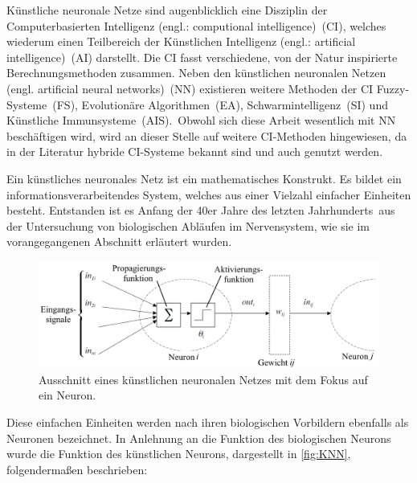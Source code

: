 
Künstliche neuronale Netze sind augenblicklich eine Disziplin der Computerbasierten Intelligenz (engl.: computional intelligence)~(\gls{CI}), welches wiederum einen Teilbereich der Künstlichen Intelligenz (engl.: artificial intelligence)~(\gls{AI}) darstellt. Die CI fasst verschiedene, von der Natur inspirierte Berechnungsmethoden zusammen. Neben den künstlichen neuronalen Netzen (engl. artificial neural networks)~(\gls{NN}) existieren weitere Methoden der CI Fuzzy-Systeme~(\gls{FS}), Evolutionäre Algorithmen~(\gls{EA}), Schwarmintelligenz~(\gls{SI}) und Künstliche \hbox{Immunsysteme~(\gls{AIS})}.\, Obwohl sich diese Arbeit wesentlich mit NN beschäftigen wird, wird an dieser Stelle auf weitere CI-Methoden hingewiesen, da in der Literatur hybride CI-Systeme bekannt sind und auch genutzt werden.

Ein künstliches neuronales Netz ist ein mathematisches Konstrukt. Es bildet ein informationsverarbeitendes System, welches aus einer Vielzahl einfacher Einheiten besteht. Entstanden ist es Anfang der 40er Jahre des letzten Jahrhunderts\, aus der Untersuchung von biologischen Abläufen im Nervensystem, wie sie im vorangegangenen Abschnitt erläutert wurden. 

\begin{figure}[!htb]
    \centering
        \includegraphics[width=1\textwidth]{Bilder/misc/kuenstliches_neuron.png}
    \caption[Künstliches Neuron (Perceptron)]{Ausschnitt eines künstlichen neuronalen Netzes mit dem Fokus auf ein Neuron.\,\protect\footnotemark{}}
    \label{fig:KNN}
\end{figure}

\addtocounter{footnote}{-1}     %
\addtocounter{Hfootnote}{-1}    %
\wrapfigfoot{}


Diese einfachen Einheiten werden nach ihren biologischen Vorbildern ebenfalls als Neuronen bezeichnet. In Anlehnung an die Funktion des biologischen Neurons wurde die Funktion des künstlichen Neurons, dargestellt in \autoref{fig:KNN}, folgendermaßen beschrieben:

